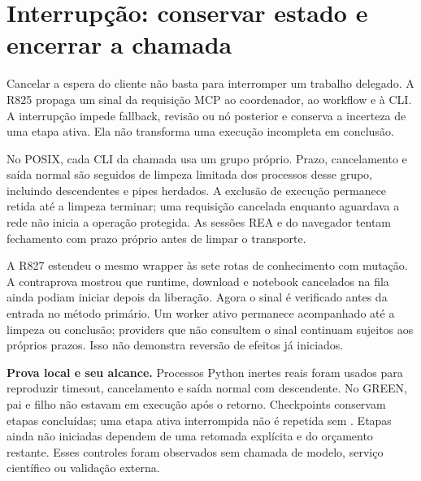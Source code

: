 \clearpage
\section{Interrupção: conservar estado e encerrar a chamada}


\begin{descricao}
Cancelar a espera do cliente não basta para interromper um trabalho delegado.
A R825 propaga um sinal da requisição MCP ao coordenador, ao workflow e à CLI.
A interrupção impede fallback, revisão ou nó posterior e conserva a incerteza
de uma etapa ativa. Ela não transforma uma execução incompleta em conclusão.
\end{descricao}

\begin{metodo}
No POSIX, cada CLI da chamada usa um grupo próprio. Prazo, cancelamento e saída
normal são seguidos de limpeza limitada dos processos desse grupo, incluindo
descendentes e pipes herdados. A exclusão de execução permanece retida até a
limpeza terminar; uma requisição cancelada enquanto aguardava a rede não inicia
a operação protegida. As sessões REA e do navegador tentam fechamento com prazo
próprio antes de limpar o transporte.
\end{metodo}

\noindent A R827 estendeu o mesmo wrapper às sete rotas de conhecimento com
mutação. A contraprova mostrou que runtime, download e notebook cancelados na
fila ainda podiam iniciar depois da liberação. Agora o sinal é verificado antes
da entrada no método primário. Um worker ativo permanece acompanhado até a
limpeza ou conclusão; providers que não consultem o sinal continuam sujeitos
aos próprios prazos. Isso não demonstra reversão de efeitos já iniciados.

\begin{resultado}
\textbf{Prova local e seu alcance.} Processos Python inertes reais foram usados
para reproduzir timeout, cancelamento e saída normal com descendente. No GREEN,
pai e filho não estavam em execução após o retorno. Checkpoints conservam etapas
concluídas; uma etapa ativa interrompida não é repetida sem
. Etapas ainda não iniciadas dependem de uma retomada
explícita e do orçamento restante. Esses controles foram observados sem chamada
de modelo, serviço científico ou validação externa.
\end{resultado}

